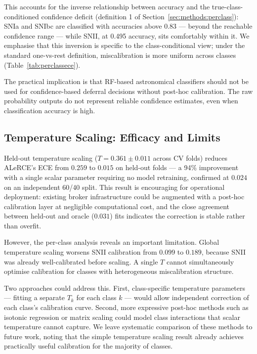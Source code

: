 This accounts for the inverse relationship between accuracy and the
true-class-conditioned confidence deficit (definition 1 of
Section~\ref{sec:methods:perclass}): SNIa and SNIbc are classified
with accuracies above 0.83 — beyond the reachable confidence range —
while SNII, at 0.495 accuracy, sits comfortably within it. We
emphasise that this inversion is specific to the class-conditional
view; under the standard one-vs-rest definition, miscalibration is
more uniform across classes (Table~\ref{tab:perclassece}).

The practical implication is that RF-based astronomical classifiers 
should not be used for confidence-based deferral decisions without 
post-hoc calibration. The raw probability outputs do not represent 
reliable confidence estimates, even when classification accuracy 
is high.

\subsection{Temperature Scaling: Efficacy and Limits}
\label{sec:discussion:tempscaling}

Held-out temperature scaling ($T = 0.361 \pm 0.011$ across CV folds)
reduces ALeRCE's ECE from $0.259$ to $0.015$ on held-out folds — a
94\% improvement with a single scalar parameter requiring no model
retraining, confirmed at $0.024$ on an independent 60/40 split. This
result is encouraging for operational deployment: existing broker
infrastructure could be augmented with a post-hoc calibration layer
at negligible computational cost, and the close agreement between
held-out and oracle ($0.031$) fits indicates the correction is
stable rather than overfit.

However, the per-class analysis reveals an important limitation. 
Global temperature scaling worsens SNII calibration from $0.099$ 
to $0.189$, because SNII was already well-calibrated before 
scaling. A single $T$ cannot simultaneously optimise calibration 
for classes with heterogeneous miscalibration structure. 

Two approaches could address this. First, class-specific
temperature parameters — fitting a separate $T_k$ for each
class $k$ — would allow independent correction of each
class's calibration curve. Second, more expressive post-hoc
methods such as isotonic regression \citep{Zadrozny2002} or
matrix scaling \citep{Kull2019} could model class interactions
that scalar temperature cannot capture. We leave systematic
comparison of these methods to future work, noting that the
simple temperature scaling result already achieves practically
useful calibration for the majority of classes.

